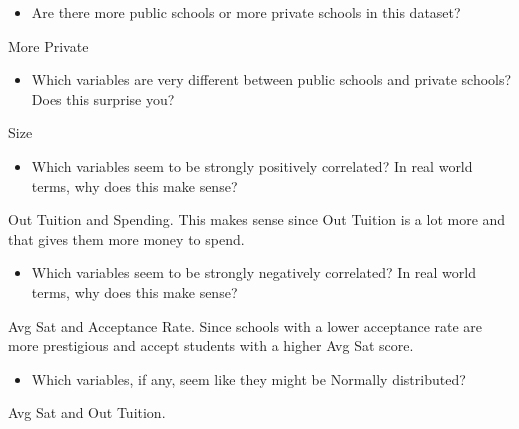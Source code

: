 \documentclass[]{article}
\providecommand{\tightlist}{%
  \setlength{\itemsep}{0pt}\setlength{\parskip}{0pt}}
\begin{document}
\begin{itemize}
\tightlist
\item
  Are there more public schools or more private schools in this dataset?
\end{itemize}

More Private

\begin{itemize}
\tightlist
\item
  Which variables are very different between public schools and private
  schools? Does this surprise you?
\end{itemize}

Size

\begin{itemize}
\tightlist
\item
  Which variables seem to be strongly positively correlated? In real
  world terms, why does this make sense?
\end{itemize}

Out Tuition and Spending. This makes sense since Out Tuition is a lot
more and that gives them more money to spend.

\begin{itemize}
\tightlist
\item
  Which variables seem to be strongly negatively correlated? In real
  world terms, why does this make sense?
\end{itemize}

Avg Sat and Acceptance Rate. Since schools with a lower acceptance rate
are more prestigious and accept students with a higher Avg Sat score.

\begin{itemize}
\tightlist
\item
  Which variables, if any, seem like they might be Normally distributed?
\end{itemize}

Avg Sat and Out Tuition.
\end{document}
